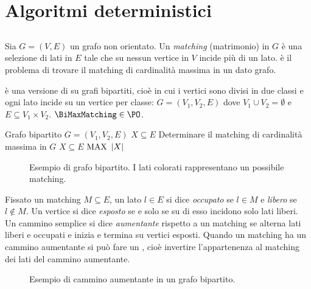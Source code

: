 \chapter{Algoritmi deterministici}



\section{\BiMaxMatching}
Sia $G=(V,E)$ un grafo non orientato. Un \emph{matching} (matrimonio) in $G$ è una selezione di lati in $E$ tale che su nessun vertice in $V$ incide più di un lato.
\MaxMatching è il problema di trovare il matching di cardinalità massima in un dato grafo.

\BiMaxMatching è una versione di \MaxMatching su grafi bipartiti, cioè in cui i vertici sono divisi in due classi e ogni lato incide su un vertice per classe: $G=(V_1,V_2,E)$ dove $V_1\cup V_2=\emptyset$ e $E\subseteq V_1\times V_2$. $\BiMaxMatching\in\PO$.

\popt{\BiMaxMatching}
{Grafo bipartito $G=(V_1,V_2,E)$}
{$X\subseteq E$}
{Determinare il matching di cardinalità massima in $G$}
{$X\subseteq E$}
{$\mathrm{MAX}$}
{$| X |$}

\begin{figure}
	\centering
	
	\caption{Esempio di grafo bipartito. I lati colorati rappresentano un possibile matching.}
	\label{fig:graphmatching}
\end{figure}

Fissato un matching $M\subseteq E$, un lato $l\in E$ si dice \emph{occupato} se $l\in M$ e \emph{libero} se $l\notin M$.
Un vertice si dice \emph{esposto} se e solo se su di esso incidono solo lati liberi. Un cammino semplice si dice \emph{aumentante} rispetto a un matching se alterna lati liberi e occupati e inizia e termina su vertici esposti.
Quando un matching ha un cammino aumentante si può fare un , cioè invertire l'appartenenza al matching dei lati del cammino aumentante.

\begin{figure}
	\centering
	\begin{subfigure}[b]{0.4\textwidth}
		\centering
		
	\end{subfigure}
	\begin{subfigure}[b]{0.4\textwidth}
		\centering
		
	\end{subfigure}
	\caption{Esempio di cammino aumentante in un grafo bipartito.}
	\label{fig:augpaths}
\end{figure}

